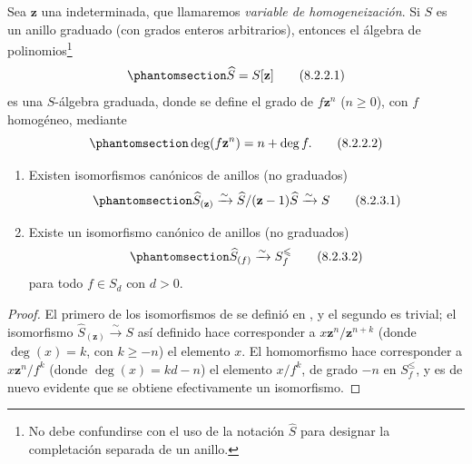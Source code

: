 \documentclass[oneside,10pt]{amsart}
\renewcommand{\leq}{\leqslant}
\renewcommand{\geq}{\geqslant}
\newcommand{\oldpage}[2][]{\marginnote{\normalfont\footnotesize\textbf{#1}~|~#2}\ignorespaces}
\let\EGAOriginalLabel\label
\renewcommand{\label}[1]{\phantomsection\EGAOriginalLabel{#1}}
\begin{document}
\begin{env}[8.2.2]
\label{II.8.2.2-fr}
Sea $\mathbf{z}$ una indeterminada, que llamaremos \emph{variable de homogeneización}.
Si $S$ es un anillo graduado (con grados enteros arbitrarios), entonces el álgebra de polinomios\footnote{No debe confundirse con el uso de la notación $\widehat{S}$ para designar la completación separada de un anillo.}
\begin{equation}
\label{II.8.2.2.1-fr}
  \widehat{S}=S[\mathbf{z}]
\tag{8.2.2.1}
\end{equation}
\oldpage[II]{158}
es una $S$-álgebra graduada, donde se define el grado de $f\mathbf{z}^n$ ($n\geq0$), con $f$ homogéneo, mediante
\begin{equation}
\label{II.8.2.2.2-fr}
  \deg(f\mathbf{z}^n)=n+\deg f.
\tag{8.2.2.2}
\end{equation}
\end{env}

\begin{lemma}[8.2.3]
\label{II.8.2.3-fr}
\begin{enumerate}
  \item[\rm{(i)}] Existen isomorfismos canónicos de anillos (no graduados)
    \begin{equation}
\label{II.8.2.3.1-fr}
  \widehat{S}_{(\mathbf{z})}\xrightarrow{\sim}
  \widehat{S}/(\mathbf{z}-1)\widehat{S}\xrightarrow{\sim}S
\tag{8.2.3.1}
\end{equation}
  \item[\rm{(ii)}] Existe un isomorfismo canónico de anillos (no graduados)
    \begin{equation}
\label{II.8.2.3.2-fr}
  \widehat{S}_{(f)}\xrightarrow{\sim}S_f^{\leq}
\tag{8.2.3.2}
\end{equation}
    para todo $f\in S_d$ con $d>0$.
\end{enumerate}
\end{lemma}

\begin{proof}
El primero de los isomorfismos de  se definió en , y el segundo es trivial;
el isomorfismo $\widehat{S}_{(\mathbf{z})}\xrightarrow{\sim}S$ así definido hace corresponder a $x\mathbf{z}^n/\mathbf{z}^{n+k}$ (donde $\deg(x)=k$, con $k\geq-n$) el elemento $x$.
El homomorfismo  hace corresponder a $x\mathbf{z}^n/f^k$ (donde $\deg(x)=kd-n$) el elemento $x/f^k$, de grado $-n$ en $S_f^{\leq}$, y es de nuevo evidente que se obtiene efectivamente un isomorfismo.
\end{proof}
\end{document}
